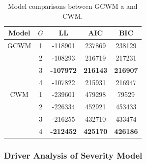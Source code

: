\documentclass[11pt,letterpaper]{article}
\numberwithin{equation}{section}
\numberwithin{equation}{section}
\numberwithin{equation}{section}
\begin{document}
\begin{table}[!htb]
\begin{center}
     	\caption{Model comparisons between GCWM a and CWM.}
        \begin{tabular}{ccccc}
        		\hline\hline	
				Model & $G$ & LL & AIC    & BIC    \\
				\hline
			GCWM & 1& -118901 & 237869 & 238129  \\
						& 2& -108293  & 216719 & 217231 \\
						&3  &  \textbf{-107972 } & \textbf{216143} & \textbf{216907}\\
						& 4 & -107822  & 215931 &  216947 \\
				CWM &  1  & -239601 &  479298  & 79529 \\
				& 2 & -226334 & 452921 & 453433  \\
				& 3 & -216255  & 432710 & 433474  \\
				& 4 & \textbf{-212452}   &\textbf{425170}&\textbf{426186}\\
				\hline\hline
\end{tabular}
\end{center}
\end{table}

\subsubsection{Driver Analysis of Severity Model}
\end{document}
